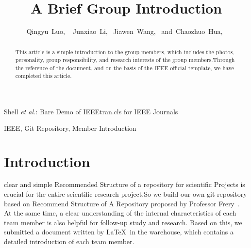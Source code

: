 \documentclass[journal]{IEEEtran}
\begin{document}
\title{A Brief Group Introduction}


\author{Qingyu~Luo, ~
        Junxiao~Li,~
        Jiawen~Wang,~
        and~Chaozhuo~Hua,~%
}


%
{Shell \MakeLowercase{\textit{et al.}}: Bare Demo of IEEEtran.cls for IEEE Journals}




\maketitle

\begin{abstract}
	This article is a simple introduction to the group members, which includes the photos, personality, group responsibility, and research interests of the group members.Through the reference of the document, and on the basis of the IEEE official template, we have completed this article.
\end{abstract}

\begin{IEEEkeywords}
IEEE, Git Repository, Member Introduction
\end{IEEEkeywords}




\IEEEpeerreviewmaketitle



\section{Introduction}

 clear and simple Recommended Structure of a repository for scientific Projects is crucial for the entire scientific research project.So we build our own git repository based on Recommend Structure of A Repository proposed by Professor Frery~\cite{2020A}.
At the same time, a clear understanding of the internal characteristics of each team member is also helpful for follow-up study and research. 
Based on this, we submitted a document written by \LaTeX\ in the warehouse, which contains a detailed introduction of each team member.
\end{document}
